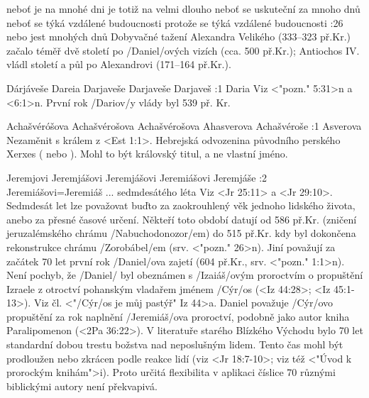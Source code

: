     {neboť je na mnohé dni}      
    {je totiž na velmi dlouho}      
    {neboť se uskuteční za mnoho dnů}      
    {neboť se týká vzdálené budoucnosti}      
    {protože se týká vzdálené budoucnosti}    
:26 {nebo jest mnohých dnů} Dobyvačné tažení Alexandra Velikého (333--323 př.Kr.) začalo téměř dvě století po \x/Daniel/ových vizích (cca. 500 př.Kr.); Antiochos IV. vládl století a půl po Alexandrovi (171--164 př.Kr.). 

    {Dárjáveše}   %
    {Dareia}   %
    {Darjaveše}   %
    {Darjaveše}   %
    {Darjaveš}   %
:1 {Daria} Viz <"pozn." 5:31>n a <6:1>n. První rok \x/Dariov/y vlády byl 539 př. Kr.

 {Achašvéróšova} {Achašvérošova} {Achašvérošova} {Ahasverova} {Achašvéroše}
:1 {Asverova} Nezaměnit s králem z <Est 1:1>.  Hebrejská odvozenina původního perského Xerxes ( nebo ). Mohl to být královský titul, a ne vlastní jméno. 

   {Jeremjovi}   %
   {Jeremjášovi}   %
   {Jeremjášovi}   %
   {Jeremiášovi}   %
   {Jeremjáše}   %
:2 {Jeremiášovi}={Jeremiáš ... sedmdesátého léta} Viz <Jr 25:11> a <Jr 29:10>.
        Sedmdesát let lze považovat buďto za zaokrouhlený věk jednoho lidského života, anebo za přesné časové určení. Někteří toto období datují od 586 př.Kr. (zničení jeruzalémského chrámu \x/Nabuchodonozor/em) do 515 př.Kr. kdy byl dokončena rekonstrukce chrámu 
        \x/Zorobábel/em (srv. <"pozn." 26>n). Jiní považují za začátek 70 let první rok \x/Daniel/ova zajetí (604 př.Kr., srv. <"pozn." 1:1>n). 
        Není pochyb, že \x/Daniel/ byl obeznámen s \x/Izaiáš/ovým proroctvím o propuštění Izraele z otroctví pohanským vladařem jménem  \x/Cýr/os (<Iz 44:28>; <Iz 45:1-13>).
        Viz čl. <"\x/Cýr/os je můj pastýř" Iz 44>a.
        Daniel považuje \x/Cýr/ovo propuštění za rok naplnění \x/Jeremiáš/ova proroctví, podobně jako autor kniha Paralipomenon 
        (<2Pa 36:22>). V literatuře starého Blízkého Východu bylo 70 let standardní dobou trestu božstva nad neposlušným lidem. Tento čas mohl být prodloužen nebo zkrácen podle reakce lidí (viz <Jr 18:7-10>; viz též <"Úvod k prorockým knihám">i). Proto  určitá flexibilita  v aplikaci číslice 70 různými biblickými autory není překvapivá.
        
